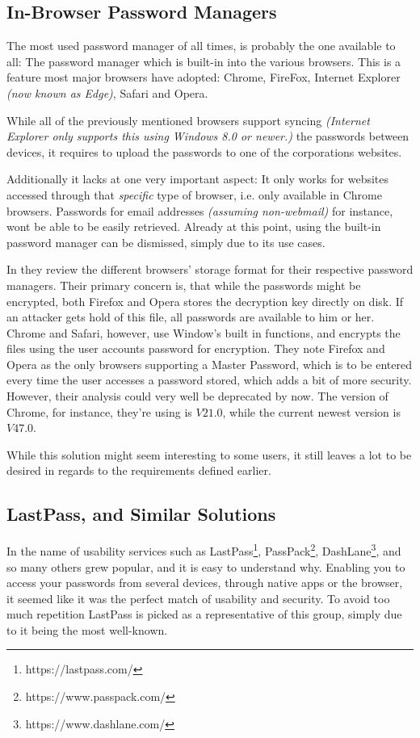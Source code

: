 		\subsection*{In-Browser Password Managers}
			\label{subsec:in-browser}

			The most used password manager of all times, is probably the one available to all: The password manager which is built-in into the various browsers. This is a feature most major browsers have adopted: Chrome, FireFox, Internet Explorer \emph{(now known as Edge)}, Safari and Opera.

			While all of the previously mentioned browsers support syncing \emph{(Internet Explorer only supports this using Windows 8.0 or newer.)} the passwords between devices, it requires to upload the passwords to one of the corporations websites.

			Additionally it lacks at one very important aspect: It only works for websites accessed through that \emph{specific} type of browser, i.e. only available in Chrome browsers. Passwords for email addresses  \emph{(assuming non-webmail)} for instance, wont be able to be easily retrieved. Already at this point, using the built-in password manager can be dismissed, simply due to its use cases.

			In \cite{browser_saved} they review the different browsers' storage format for their respective password managers. Their primary concern is, that while the passwords might be encrypted, both Firefox and Opera stores the decryption key directly on disk. If an attacker gets hold of this file, all passwords are available to him or her. Chrome and Safari, however, use Window's built in functions, and encrypts the files using the user accounts password for encryption. They note Firefox and Opera as the only browsers supporting a Master Password, which is to be entered every time the user accesses a password stored, which adds a bit of more security. However, their analysis could very well be deprecated by now. The version of Chrome, for instance, they're using is $V21.0$, while the current newest version is $V47.0$. 

			While this solution might seem interesting to some users, it still leaves a lot to be desired in regards to the requirements defined earlier.

		\subsection*{LastPass, and Similar Solutions}
			\label{subsec:lastpass}
			In the name of usability services such as LastPass\footnote{https://lastpass.com/}, PassPack\footnote{https://www.passpack.com/}, DashLane\footnote{https://www.dashlane.com/}, and so many others grew popular, and it is easy to understand why. Enabling you to access your passwords from several devices, through native apps or the browser, it seemed like it was the perfect match of usability and security. To avoid too much repetition LastPass is picked as a representative of this group, simply due to it being the most well-known.

